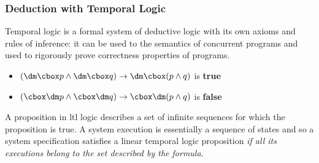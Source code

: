 \subsubsection{Deduction with Temporal Logic}\label{sub:an_deduction_with_temporal_logic} %
Temporal logic is a formal system of deductive logic with its own axioms and rules of inference: it can be used to  the semantics of concurrent programs and used to rigorously prove correctness properties of programs.
\begin{example}{}{}
    \begin{itemize}
        \item $(\dm\cbox p \land \dm\cbox q) \to \dm\cbox (p\land q)$ is \textbf{true}
        \item $(\cbox\dm p \land \cbox\dm q) \to \cbox\dm (p\land q)$ is \textbf{false}
    \end{itemize}
\end{example}
A proposition in \ac{ltl} logic describes a set of infinite sequences for which the proposition is true.
A system execution is essentially a sequence of states and so a system specification satisfies a linear temporal logic proposition \textit{if all its executions belong to the set described by the formula}.
%
